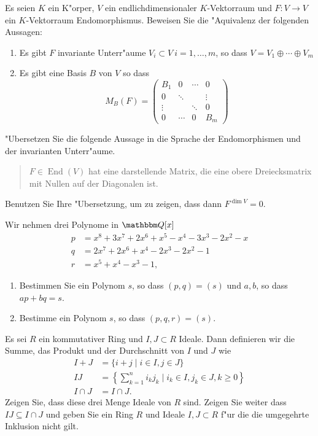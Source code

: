 \documentclass[a4,11pt]{article}
\DeclareMathOperator{\End}{End}
\begin{document}
\begin{aufgabe}
Es seien $K$ ein K"orper, $V$ ein endlichdimensionaler $K$-Vektorraum und $F : V \rightarrow V$ ein $K$-Vektorraum Endomorphismus. Beweisen Sie die "Aquivalenz der folgenden Aussagen:


\begin{enumerate}
\item Es gibt $F$ invariante Unterr"aume $V_i \subset V \ i= 1,\dots , m$, so dass $V = V_1 \oplus \cdots \oplus V_m$
\item Es gibt eine Basis $B$ von $V$ so dass 
\[
M_B(F) = \begin{pmatrix}B_1 & 0 & \cdots& 0\\
0& \ddots & & \vdots \\
\vdots & & \ddots& 0 \\
0 & \cdots & 0 & B_m
\end{pmatrix}
\]
\end{enumerate}
\end{aufgabe}

\begin{aufgabe}
  "Ubersetzen Sie die folgende Aussage in die Sprache der
  Endomorphismen und der invarianten Unterr"aume.
  \begin{quotation}
    $F \in \End(V)$ hat eine darstellende Matrix, die eine obere
    Dreiecksmatrix mit Nullen auf der Diagonalen ist.
  \end{quotation}

  Benutzen Sie Ihre "Ubersetzung, um zu zeigen, dass dann $F^{\dim V}
  = 0$.
\end{aufgabe}

\begin{aufgabe}
Wir nehmen drei Polynome in $\Q[x]$
\begin{align*}
p &= x^8 + 3x^7 + 2x^6 + x^5 - x^4 - 3x^3 - 2x^2 - x\\
q &= 2x^7 + 2x^6 + x^4 - 2x^3 - 2x^2 - 1\\
r &= x^5 + x^4 - x^3 - 1,
\end{align*}
\begin{enumerate}
\item
  Bestimmen Sie ein Polynom $s$, so dass $(p,q) = (s)$
  und $a,b$, so dass $ap+bq=s$.
\item
  Bestimme ein Polynom $s$, so dass $(p,q,r) = (s)$.
 \end{enumerate}
\end{aufgabe}

\begin{aufgabe}

Es sei $R$ ein kommutativer Ring und $I, J \subset R$ Ideale. Dann definieren wir die Summe, das Produkt und der Durchschnitt von $I$ und $J$ wie
\begin{align*}
I + J &= \{ i + j \mid i \in I, j \in J \}\\
IJ &= \left\{ \sum_{k = 1}^n i_k j_k \mid i_k \in I, j_k \in J, k \geq 0 \right\}\\
I \cap J &= I \cap J.
\end{align*}
Zeigen Sie, dass diese drei Menge Ideale von $R$ sind. Zeigen Sie weiter dass $IJ \subseteq I \cap J$ und geben Sie ein Ring $R$ und Ideale $I, J \subset R$ f"ur die die umgegehrte Inklusion nicht gilt.  
\end{aufgabe}
\end{document}
